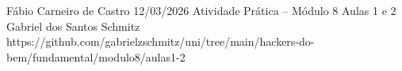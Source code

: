 \documentclass{article}
\begin{document}
{Fábio Carneiro de Castro}
{12/03/2026}
{Atividade Prática -- Módulo 8}
{Aulas 1 e 2}
{Gabriel dos Santos Schmitz}
{https://github.com/gabrielzschmitz/uni/tree/main/hackers-do-bem/fundamental/modulo8/aulas1-2}




\newpage
\printbibliography[title=Referências]
\end{document}
